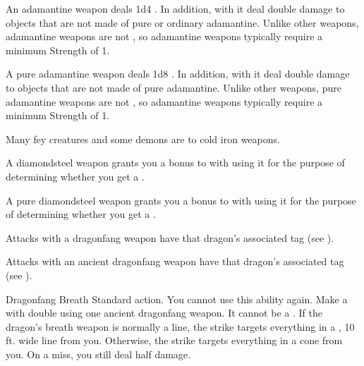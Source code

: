        An adamantine weapon deals \plus1d4 .
      In addition,  with it deal double damage to objects that are not made of pure or ordinary adamantine.
      Unlike other weapons, adamantine weapons are not , so  adamantine weapons typically require a minimum Strength of 1.

       A pure adamantine weapon deals \plus1d8 .
      In addition,  with it deal double damage to objects that are not made of pure adamantine.
      Unlike other weapons, pure adamantine weapons are not , so  adamantine weapons typically require a minimum Strength of 1.

       Many fey creatures and some demons are  to cold iron weapons.

       A diamondsteel weapon grants you a  bonus to  with  using it for the purpose of determining whether you get a .

       A pure diamondsteel weapon grants you a  bonus to  with  using it for the purpose of determining whether you get a .

       Attacks with a dragonfang weapon have that dragon's associated tag (see ).

       Attacks with an ancient dragonfang weapon have that dragon's associated tag (see ).
      \begin{activeability}{Dragonfang Breath}
        \abilityusagetime Standard action.
        \abilitycost You  cannot use this ability again.
        \rankline
        Make a  with double  using one ancient dragonfang weapon.
        It cannot be a .
        If the dragon's breath weapon is normally a line, the strike targets everything in a \arealarge, 10 ft. wide line from you.
        Otherwise, the strike targets everything in a \areamed cone from you.
        On a miss, you still deal half damage.
      \end{activeability}

